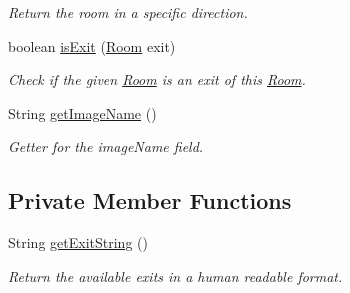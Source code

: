 \begin{DoxyCompactItemize}
\begin{DoxyCompactList}\small\item\em Return the room in a specific direction. \end{DoxyCompactList}\item 
boolean \hyperlink{classpkg__world_1_1Room_a305aab25719c2b75a0c28c9a53a3c9d3}{is\-Exit} (\hyperlink{classpkg__world_1_1Room}{Room} exit)
\begin{DoxyCompactList}\small\item\em Check if the given \hyperlink{classpkg__world_1_1Room}{Room} is an exit of this \hyperlink{classpkg__world_1_1Room}{Room}. \end{DoxyCompactList}\item 
String \hyperlink{classpkg__world_1_1Room_a5d1a496c1fd2e4ba73177e1182c9f4f1}{get\-Image\-Name} ()
\begin{DoxyCompactList}\small\item\em Getter for the image\-Name field. \end{DoxyCompactList}\end{DoxyCompactItemize}
\subsection*{Private Member Functions}
\begin{DoxyCompactItemize}
\item 
String \hyperlink{classpkg__world_1_1Room_ac712fe83b1f0d11c82ebea83f893d0f2}{get\-Exit\-String} ()
\begin{DoxyCompactList}\small\item\em Return the available exits in a human readable format. \end{DoxyCompactList}\end{DoxyCompactItemize}
